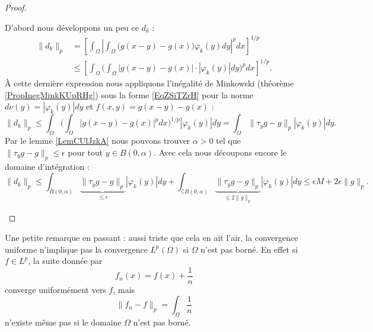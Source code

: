 \begin{proof}
\begin{enumerate}
            D'abord nous développons un peu ce \( d_k\) :
            \begin{subequations}
                \begin{align}
                \| d_k \|_p&=\left[ \int_{\Omega}\left|     \int_{\Omega}\big( g(x-y)-g(x) \big)\varphi_k(y)dy  \right|^pdx \right]^{1/p}\\
                &\leq\left[    \int_{\Omega}\Big( \int_{\Omega}| g(x-y)-g(x) |\cdot |\varphi_k(y) |dy \Big)^pdx \right]^{1/p}.
                \end{align}
            \end{subequations}
            À cette dernière expression nous appliquons l'inégalité de Minkowski (théorème \ref{PropInegMinkKUpRHg}) sous la forme \eqref{EqZSiTZrH} pour la norme \( d\nu(y)=| \varphi_k(y) |dy\) et \( f(x,y)=g(x-y)-g(x)\) :
            \begin{equation}
                \| d_k \|_p\leq \int_{\Omega}\Big( \int_{\Omega}\big| g(x-y)-g(x) \big|^pdx \Big)^{1/p}| \varphi_k(y) |dy=\int_{\Omega}\| \tau_yg-g \|_p| \varphi_k(y) |dy.
            \end{equation}
            Par le lemme \ref{LemCUlJzkA} nous pouvons trouver \( \alpha>0\) tel que \( \| \tau_yg-g \|_p\leq \epsilon\) pour tout \( y\in B(0,\alpha)\). Avec cela nous découpons encore le domaine d'intégration :
            \begin{equation}
                \| d_k \|_p\leq \int_{B(0,\alpha)}\underbrace{\| \tau_yg-g \|_p}_{\leq \epsilon}| \varphi_k(y) |dy+\int_{\complement B(0,\alpha)}  \underbrace{\| \tau_yg-g \|_p}_{\leq 2\| g \|_p}| \varphi_k(y) |dy\leq \epsilon M+2\epsilon\| g \|_p.
            \end{equation}
    \end{enumerate}
\end{proof}

Une petite remarque en passant : aussi triste que cela en ait l'air, la convergence uniforme n'implique pas la convergence \( L^p(\Omega)\) si \( \Omega\) n'est pas borné. En effet si \( f\in L^p\), la suite donnée par
\begin{equation}
    f_n(x)=f(x)+\frac{1}{ n }
\end{equation}
converge uniformément vers \( f\), mais 
\begin{equation}
    \| f_n-f \|_p=\int_{\Omega}\frac{1}{ n }
\end{equation}
n'existe même pas si le domaine \( \Omega\) n'est pas borné.

